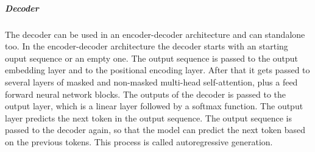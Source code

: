 \subparagraph{Decoder}

The decoder can be used in an encoder-decoder architecture and can standalone too. 
In the encoder-decoder architecture the decoder starts with an starting ouput sequence or an empty one. The output sequence is passed to the output embedding layer and to the positional encoding layer. After that it gets passed to several layers of masked and non-masked multi-head self-attention, plus a feed forward neural network blocks. The outputs of the decoder is passed to the output layer, which is a linear layer followed by a softmax function. The output layer predicts the next token in the output sequence. The output sequence is passed to the decoder again, so that the model can predict the next token based on the previous tokens. This process is called autoregressive generation.



